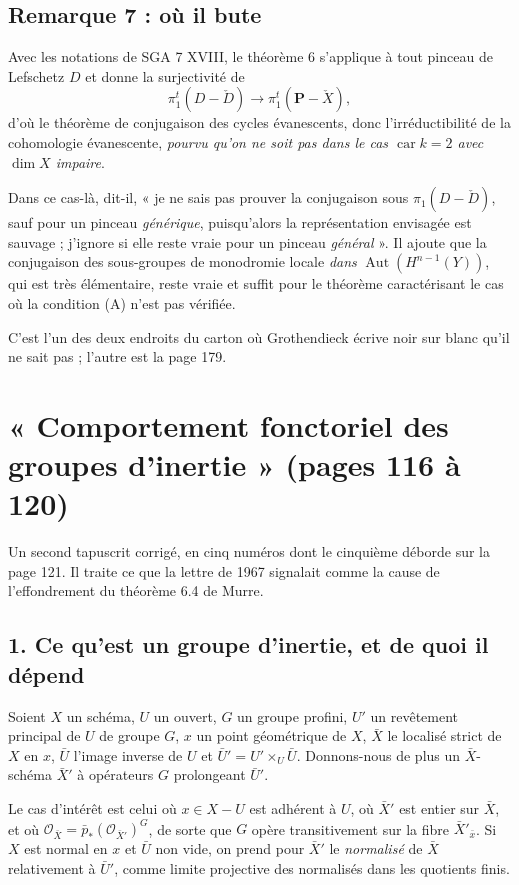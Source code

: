 \documentclass[11pt,a4paper]{article}
\begin{document}
\subsection*{Remarque 7 : où il bute}

Avec les notations de SGA 7 XVIII, le théorème 6 s'applique à tout pinceau de
Lefschetz $D$ et donne la surjectivité de
\[
  \pi^{t}_{1}(D - \check{D}) \longrightarrow
  \pi^{t}_{1}(\mathbf{P} - \check{X}) ,
\]
d'où le théorème de conjugaison des cycles évanescents, donc
l'irréductibilité de la cohomologie évanescente, \emph{pourvu qu'on ne soit
pas dans le cas $\operatorname{car} k = 2$ avec $\dim X$ impaire}.

Dans ce cas-là, dit-il, « je ne sais pas prouver la conjugaison sous
$\pi_{1}(D - \check{D})$, sauf pour un pinceau \emph{générique}, puisqu'alors
la représentation envisagée est sauvage ; j'ignore si elle reste vraie pour un
pinceau \emph{général} ». Il ajoute que la conjugaison des sous-groupes de
monodromie locale \emph{dans} $\operatorname{Aut}(H^{n-1}(Y))$, qui est très
élémentaire, reste vraie et suffit pour le théorème caractérisant le cas où la
condition (A) n'est pas vérifiée.

C'est l'un des deux endroits du carton où Grothendieck écrive noir sur blanc
qu'il ne sait pas ; l'autre est la page 179.

\section*{« Comportement fonctoriel des groupes d'inertie » (pages 116 à 120)}

Un second tapuscrit corrigé, en cinq numéros dont le cinquième déborde sur la
page 121. Il traite ce que la lettre de 1967 signalait comme la cause de
l'effondrement du théorème 6.4 de Murre.

\subsection*{1. Ce qu'est un groupe d'inertie, et de quoi il dépend}

Soient $X$ un schéma, $U$ un ouvert, $G$ un groupe profini, $U'$ un revêtement
principal de $U$ de groupe $G$, $x$ un point géométrique de $X$, $\bar{X}$ le
localisé strict de $X$ en $x$, $\bar{U}$ l'image inverse de $U$ et
$\bar{U}' = U' \times_{U} \bar{U}$. Donnons-nous de plus un $\bar{X}$-schéma
$\bar{X}'$ à opérateurs $G$ prolongeant $\bar{U}'$.

Le cas d'intérêt est celui où $x \in X - U$ est adhérent à $U$, où $\bar{X}'$
est entier sur $\bar{X}$, et où
$\mathcal{O}_{\bar{X}} = \bar{p}_{*}(\mathcal{O}_{\bar{X}'})^{G}$, de sorte
que $G$ opère transitivement sur la fibre $\bar{X}'_{\bar{x}}$. Si $X$ est
normal en $x$ et $\bar{U}$ non vide, on prend pour $\bar{X}'$ le
\emph{normalisé} de $\bar{X}$ relativement à $\bar{U}'$, comme limite projective
des normalisés dans les quotients finis.
\end{document}
